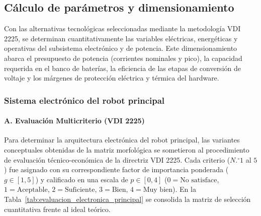 \subsection{Cálculo de parámetros y dimensionamiento}

Con las alternativas tecnológicas seleccionadas mediante la metodología VDI 2225, se determinan cuantitativamente las variables eléctricas, energéticas y operativas del subsistema electrónico y de potencia. Este dimensionamiento abarca el presupuesto de potencia (corrientes nominales y pico), la capacidad requerida en el banco de baterías, la eficiencia de las etapas de conversión de voltaje y los márgenes de protección eléctrica y térmica del hardware.

\subsubsection{Sistema electrónico del robot principal}

\paragraph{A. Evaluación Multicriterio (VDI 2225)}
Para determinar la arquitectura electrónica del robot principal, las variantes conceptuales obtenidas de la matriz morfológica se sometieron al procedimiento de evaluación técnico-económica de la directriz VDI 2225. Cada criterio ($N.^\circ 1$ al $5$) fue asignado con su correspondiente factor de importancia ponderada ($g \in [1,5]$) y calificado en una escala de $p \in [0,4]$ ($0=\text{No satisface}$, $1=\text{Aceptable}$, $2=\text{Suficiente}$, $3=\text{Bien}$, $4=\text{Muy bien}$). En la Tabla~\ref{tab:evaluacion_electronica_principal} se consolida la matriz de selección cuantitativa frente al ideal teórico.

